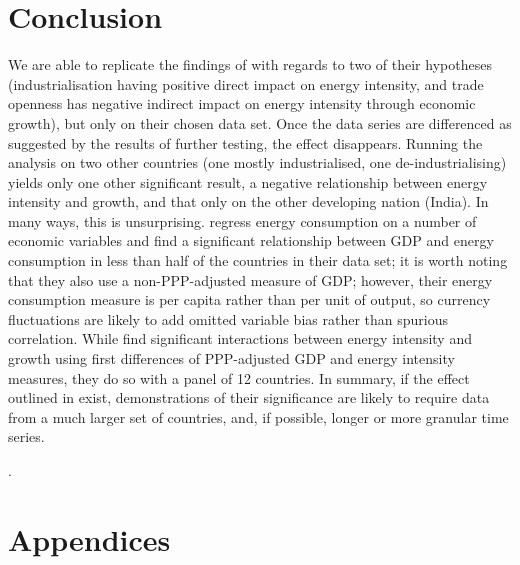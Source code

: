 \documentclass[11pt,a4paper]{article}
\begin{document}
\clearpage

\section{Conclusion}\label{sec:conclusion}

We are able to replicate the findings of \cite{panHowIndustrializationTrade2019} with regards to two of their hypotheses (industrialisation having positive direct impact on energy intensity, and trade openness has negative indirect impact on energy intensity through economic growth), but only on their chosen data set.
Once the data series are differenced as suggested by the results of further testing, the effect disappears. 
Running the analysis on two other countries (one mostly industrialised, one de-industrialising) yields only one other significant result, a negative relationship between energy intensity and growth, and that only on the other developing nation (India).
In many ways, this is unsurprising.
\cite{tibaIncomeTradeOpenness2018} regress energy consumption on a number of economic variables and find a significant relationship between GDP and energy consumption in less than half of the countries in their data set; it is worth noting that they also use a non-PPP-adjusted measure of GDP; however, their energy consumption measure is per capita rather than per unit of output, so currency fluctuations are likely to add omitted variable bias rather than spurious correlation.
While \cite{aydinDoesLevelEnergy2018} find significant interactions between energy intensity and growth using first differences of PPP-adjusted GDP and energy intensity measures, they do so with a panel of 12 countries.
In summary, if the effect outlined in  \cite{panHowIndustrializationTrade2019} exist, demonstrations of their significance are likely to require data from a much larger set of countries, and, if possible, longer or more granular time series.

\clearpage

\appendix

\renewcommand{\refname}{\section{References}}.


\clearpage

\section{Appendices}
\end{document}
